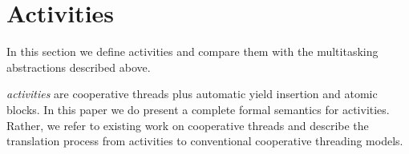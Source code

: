 \documentclass[9pt,preprint]{sigplanconf}
\begin{document}




\section{Activities}

In this section we define activities and compare them with the multitasking abstractions described above.

\emph{activities} are cooperative threads plus automatic yield insertion and atomic blocks.
In this paper we do present a complete formal semantics for activities.
Rather, we refer to existing work on cooperative threads \cite{Abadi2009} and describe the translation process from activities to conventional cooperative threading models.
\end{document}
